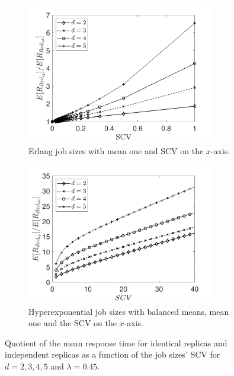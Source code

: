 \documentclass[12pt]{report}
\begin{document}
\begin{figure}[t]
\begin{subfigure}{.45\textwidth}
\begin{center}
\includegraphics[width=0.9\textwidth]{figures/Chapter3/plot_MRT_Erlang_quotient_diffd.pdf}
\caption{Erlang job sizes with mean one and SCV on the $x$-axis.}
\label{fig:compare_diffd1}
\end{center}
\end{subfigure}
\begin{subfigure}{.45\textwidth}
\begin{center}
\includegraphics[width=0.9\textwidth]{figures/Chapter3/plot_ifo_SCV_quotient_HExp_diffd.pdf}
\caption{Hyperexponential job sizes with balanced means, mean one and the SCV on the $x$-axis.}
\label{fig:compare_diffd2}
\end{center}
\end{subfigure}
\caption{Quotient of the mean response time for identical replicas and independent replicas as a function of the job sizes' SCV for $d=2,3,4,5$ and $\lambda=0.45$.}
\label{fig:compare_diffd}
\end{figure}
\end{document}
